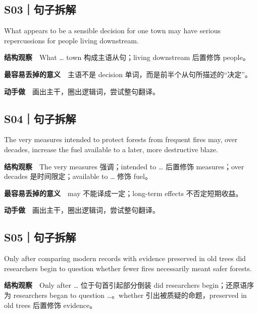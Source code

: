 \documentclass[a4paper,11pt,openany]{report}
\renewenvironment{quote}{%
 \par\begin{list}{}{\setlength{\leftmargin}{1.25em}\setlength{\rightmargin}{0em}}\item[]\color{bodygrey}\ignorespaces
}{\end{list}}
\begin{document}
\subsection{S03｜句子拆解}\label{s03ux53e5ux5b50ux62c6ux89e3}

\begin{quote}
What appears to be a sensible decision for one town may have serious repercussions for people living downstream.
\end{quote}

\textbf{结构观察}　What \ldots{} town 构成主语从句；living downstream 后置修饰 people。

\textbf{最容易丢掉的意义}　主语不是 decision 单词，而是前半个从句所描述的``决定''。

\textbf{动手做}　画出主干，圈出逻辑词，尝试整句翻译。

\subsection{S04｜句子拆解}\label{s04ux53e5ux5b50ux62c6ux89e3}

\begin{quote}
The very measures intended to protect forests from frequent fires may, over decades, increase the fuel available to a later, more destructive blaze.
\end{quote}

\textbf{结构观察}　The very measures 强调；intended to \ldots{} 后置修饰 measures；over decades 是时间限定；available to \ldots{} 修饰 fuel。

\textbf{最容易丢掉的意义}　may 不能译成一定；long-term effects 不否定短期收益。

\textbf{动手做}　画出主干，圈出逻辑词，尝试整句翻译。

\subsection{S05｜句子拆解}\label{s05ux53e5ux5b50ux62c6ux89e3}

\begin{quote}
Only after comparing modern records with evidence preserved in old trees did researchers begin to question whether fewer fires necessarily meant safer forests.
\end{quote}

\textbf{结构观察}　Only after \ldots{} 位于句首引起部分倒装 did researchers begin；还原语序为 researchers began to question \ldots。whether 引出被质疑的命题，preserved in old trees 后置修饰 evidence。
\end{document}
